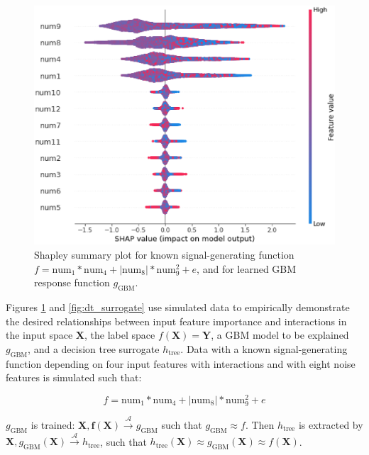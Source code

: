 \documentclass[11pt]{asaproc}
\begin{document}
\begin{figure}
	\begin{center}
		\includegraphics[scale=0.4]{img/figure_2.eps}
		\caption{Shapley summary plot for known signal-generating function $f = \text{num} _1 * \text{num}_4 + |\text{num}_8| * \text{num}_9^2 + e$, and for learned GBM response function $g_{\text{GBM}}$.}
		\label{fig:global_shapley}
	\end{center}
\end{figure}

Figures \ref{fig:global_shapley} and \ref{fig:dt_surrogate} use simulated data to empirically demonstrate the desired relationships between input feature importance and interactions in the input space $\mathbf{X}$, the label space $f(\mathbf{X}) = \mathbf{Y}$, a GBM model to be explained $g_{\text{GBM}}$, and a decision tree surrogate $h_{\text{tree}}$. Data with a known signal-generating function depending on four input features with interactions and with eight noise features is simulated such that: 

\begin{equation}
\label{eq:f}
f = \text{num} _1 * \text{num}_4 + |\text{num}_8| * \text{num}_9^2 + e
\end{equation}

\noindent$g_{\text{GBM}}$ is trained: $ \mathbf{X}, \mathbf{f(X)} \xrightarrow{\mathcal{A}} g_{\text{GBM}}$ such that $g_{\text{GBM}} \approx f$. Then $h_{\text{tree}}$ is extracted by $\mathbf{X}, g_{\text{GBM}}(\mathbf{X}) \xrightarrow{\mathcal{A}} h_{\text{tree}}$, such that $h_{\text{tree}}(\mathbf{X}) \approx g_{\text{GBM}}(\mathbf{X}) \approx f(\mathbf{X})$.
\end{document}
